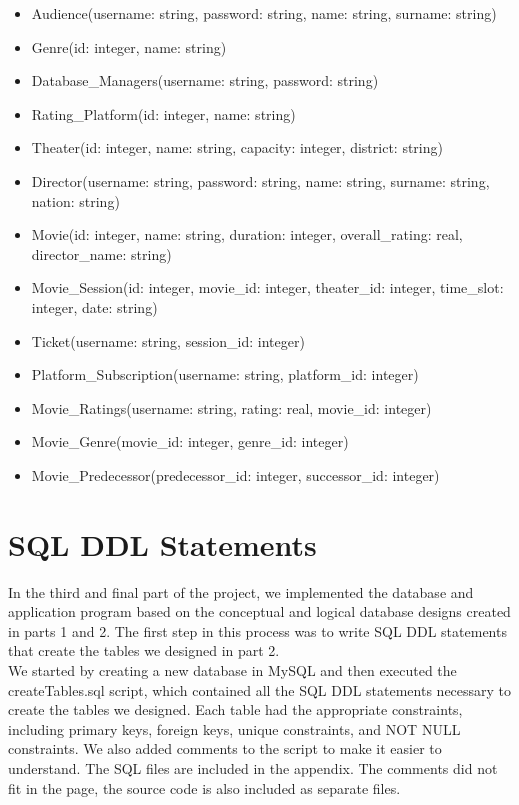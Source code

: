 \documentclass[12pt, A4, titlepage]{article}
\begin{document}
\begin{itemize}
    \item Audience(username: string, password: string, name: string, surname: string)
    \item Genre(id: integer, name: string)
    \item Database\_Managers(username: string, password: string)
    \item Rating\_Platform(id: integer, name: string)
    \item Theater(id: integer, name: string, capacity: integer, district: string)
    \item Director(username: string, password: string, name: string, surname: string, nation: string)
    \item Movie(id: integer, name: string, duration: integer, overall\_rating: real, director\_name: string)
    \item Movie\_Session(id: integer, movie\_id: integer, theater\_id: integer, time\_slot: integer, date: string)
    \item Ticket(username: string, session\_id: integer)
    \item Platform\_Subscription(username: string, platform\_id: integer)
    \item Movie\_Ratings(username: string, rating: real, movie\_id: integer)
    \item Movie\_Genre(movie\_id: integer, genre\_id: integer)
    \item Movie\_Predecessor(predecessor\_id: integer, successor\_id: integer)
\end{itemize}

\section{SQL DDL Statements}

\indent \indent In the third and final part of the project, we implemented the database and application program based on the conceptual and logical database designs created in parts 1 and 2. The first step in this process was to write SQL DDL statements that create the tables we designed in part 2. \\

We started by creating a new database in MySQL and then executed the createTables.sql script, which contained all the SQL DDL statements necessary to create the tables we designed. Each table had the appropriate constraints, including primary keys, foreign keys, unique constraints, and NOT NULL constraints. We also added comments to the script to make it easier to understand. The SQL files are included in the appendix. The comments did not fit in the page, the source code is also included as separate files. 
\end{document}
